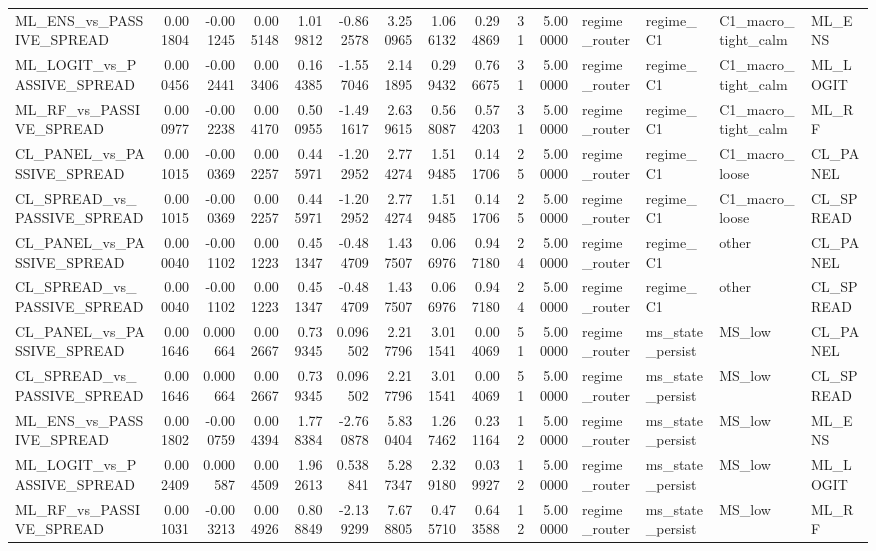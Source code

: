\begin{table}
\begin{tabular}{lrrrrrrrrrrllll}
ML_ENS_vs_PASSIVE_SPREAD & 0.001804 & -0.001245 & 0.005148 & 1.019812 & -0.862578 & 3.250965 & 1.066132 & 0.294869 & 31 & 5.000000 & regime_router & regime_C1 & C1_macro_tight_calm & ML_ENS \\
ML_LOGIT_vs_PASSIVE_SPREAD & 0.000456 & -0.002441 & 0.003406 & 0.164385 & -1.557046 & 2.141895 & 0.299432 & 0.766675 & 31 & 5.000000 & regime_router & regime_C1 & C1_macro_tight_calm & ML_LOGIT \\
ML_RF_vs_PASSIVE_SPREAD & 0.000977 & -0.002238 & 0.004170 & 0.500955 & -1.491617 & 2.639615 & 0.568087 & 0.574203 & 31 & 5.000000 & regime_router & regime_C1 & C1_macro_tight_calm & ML_RF \\
CL_PANEL_vs_PASSIVE_SPREAD & 0.001015 & -0.000369 & 0.002257 & 0.445971 & -1.202952 & 2.774274 & 1.519485 & 0.141706 & 25 & 5.000000 & regime_router & regime_C1 & C1_macro_loose & CL_PANEL \\
CL_SPREAD_vs_PASSIVE_SPREAD & 0.001015 & -0.000369 & 0.002257 & 0.445971 & -1.202952 & 2.774274 & 1.519485 & 0.141706 & 25 & 5.000000 & regime_router & regime_C1 & C1_macro_loose & CL_SPREAD \\
CL_PANEL_vs_PASSIVE_SPREAD & 0.000040 & -0.001102 & 0.001223 & 0.451347 & -0.484709 & 1.437507 & 0.066976 & 0.947180 & 24 & 5.000000 & regime_router & regime_C1 & other & CL_PANEL \\
CL_SPREAD_vs_PASSIVE_SPREAD & 0.000040 & -0.001102 & 0.001223 & 0.451347 & -0.484709 & 1.437507 & 0.066976 & 0.947180 & 24 & 5.000000 & regime_router & regime_C1 & other & CL_SPREAD \\
CL_PANEL_vs_PASSIVE_SPREAD & 0.001646 & 0.000664 & 0.002667 & 0.739345 & 0.096502 & 2.217796 & 3.011541 & 0.004069 & 51 & 5.000000 & regime_router & ms_state_persist & MS_low & CL_PANEL \\
CL_SPREAD_vs_PASSIVE_SPREAD & 0.001646 & 0.000664 & 0.002667 & 0.739345 & 0.096502 & 2.217796 & 3.011541 & 0.004069 & 51 & 5.000000 & regime_router & ms_state_persist & MS_low & CL_SPREAD \\
ML_ENS_vs_PASSIVE_SPREAD & 0.001802 & -0.000759 & 0.004394 & 1.778384 & -2.760878 & 5.830404 & 1.267462 & 0.231164 & 12 & 5.000000 & regime_router & ms_state_persist & MS_low & ML_ENS \\
ML_LOGIT_vs_PASSIVE_SPREAD & 0.002409 & 0.000587 & 0.004509 & 1.962613 & 0.538841 & 5.287347 & 2.329180 & 0.039927 & 12 & 5.000000 & regime_router & ms_state_persist & MS_low & ML_LOGIT \\
ML_RF_vs_PASSIVE_SPREAD & 0.001031 & -0.003213 & 0.004926 & 0.808849 & -2.139299 & 7.678805 & 0.475710 & 0.643588 & 12 & 5.000000 & regime_router & ms_state_persist & MS_low & ML_RF \\

\end{tabular}
\end{table}
